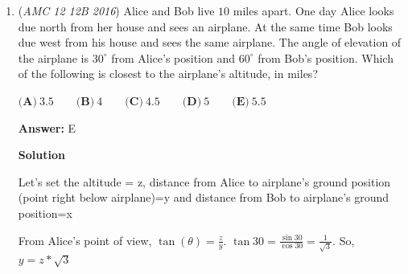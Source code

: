 \begin{enumerate}
Note that if a number other than $1$ or $9$ is in a corner, the two numbers adjacent to it must be the numbers before and after it. Thus, if $1$ is in an edge spot that isn't a corner, it will be adjacent to two corners, which isn't possible, because $1$ is not consecutive to two other numbers between $1$ and $9$. Similarly, $9$ can't go to an edge spot that isn't a corner. Therefore, two of the corner squares are $1$ and $9$.

 Filling in the table one by one, we can start with this WLOG:

 $\newline 1, 2, \_ \newline \_,  \_, \_ \newline \_,  \_, \_$

 Since $3$ is not one of the answer choices, it cannot be in the center, so it must go in the corner adjacent to $2$. That means the last corner is $18 - 1 - 3 - 9 = 5$. Thus, we can keep filling in the table to get:

 $\newline 1, 2,  3\newline 8,  7, 4\newline 9,  6,  5$

 And our answer is $\boxed{\textbf{(C)}7}$.

 


 


	\item (\textit{AMC 12 12B 2016}) Alice and Bob live $10$ miles apart. One day Alice looks due north from her house and sees an airplane. At the same time Bob looks due west from his house and sees the same airplane. The angle of elevation of the airplane is $30^\circ$ from Alice's position and $60^\circ$ from Bob's position. Which of the following is closest to the airplane's altitude, in miles?


 $\textbf{(A)}\ 3.5 \qquad\textbf{(B)}\ 4 \qquad\textbf{(C)}\ 4.5 \qquad\textbf{(D)}\ 5 \qquad\textbf{(E)}\ 5.5$

 \textbf{Answer: }E



\textbf{Solution}

Let's set the altitude = z, distance from Alice to airplane's ground position (point right below airplane)=y and distance from Bob to airplane's ground position=x

 From Alice's point of view, $\tan(\theta)=\frac{z}{y}$. $\tan{30}=\frac{\sin{30}}{\cos{30}}=\frac{1}{\sqrt{3}}$. So, $y=z*\sqrt{3}$


\end{enumerate}
